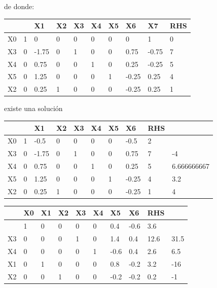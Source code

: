 \begin{itemize}
\begin{center}
de donde:        

\begin{tabular}{|l|l|l|l|l|l|l|l|l|l|}
\hline
   &   & X1    & X2 & X3 & X4 & X5 & X6    & X7    & RHS                       \\ \hline
X0 & 1 & 0     & 0  & 0  & 0  & 0  & 0     & 1     & \cellcolor[HTML]{32CB00}0 \\ \hline
X3 & 0 & -1.75 & 0  & 1  & 0  & 0  & 0.75  & -0.75 & 7                         \\ \hline
X4 & 0 & 0.75  & 0  & 0  & 1  & 0  & 0.25  & -0.25 & 5                         \\ \hline
X5 & 0 & 1.25  & 0  & 0  & 0  & 1  & -0.25 & 0.25  & 4                         \\ \hline
X2 & 0 & 0.25  & 1  & 0  & 0  & 0  & -0.25 & 0.25  & 1                         \\ \hline
\end{tabular}

existe una soluci\'on

\begin{tabular}{|l|l|l|l|l|l|l|l|l|l|}
\hline
   &   & X1                           & X2 & X3 & X4 & X5 & X6    & RHS &                             \\ \hline
X0 & 1 & -0.5                         & 0  & 0  & 0  & 0  & -0.5  & 2   &                             \\ \hline
X3 & 0 & -1.75                        & 0  & 1  & 0  & 0  & 0.75  & 7   & -4                          \\ \hline
X4 & 0 & 0.75                         & 0  & 0  & 1  & 0  & 0.25  & 5   & 6.666666667                 \\ \hline
X5 & 0 & \cellcolor[HTML]{32CB00}1.25 & 0  & 0  & 0  & 1  & -0.25 & 4   & \cellcolor[HTML]{32CB00}3.2 \\ \hline
X2 & 0 & 0.25                         & 1  & 0  & 0  & 0  & -0.25 & 1   & 4                           \\ \hline
\end{tabular}

\begin{tabular}{|l|l|l|l|l|l|l|l|l|l|}
\hline
   & X0 & X1 & X2 & X3 & X4 & X5   & X6                          & RHS  &                             \\ \hline
   & 1  & 0  & 0  & 0  & 0  & 0.4  & -0.6                        & 3.6  &                             \\ \hline
X3 & 0  & 0  & 0  & 1  & 0  & 1.4  & 0.4                         & 12.6 & 31.5                        \\ \hline
X4 & 0  & 0  & 0  & 0  & 1  & -0.6 & \cellcolor[HTML]{32CB00}0.4 & 2.6  & \cellcolor[HTML]{32CB00}6.5 \\ \hline
X1 & 0  & 1  & 0  & 0  & 0  & 0.8  & -0.2                        & 3.2  & -16                         \\ \hline
X2 & 0  & 0  & 1  & 0  & 0  & -0.2 & -0.2                        & 0.2  & -1                          \\ \hline
\end{tabular}      
        

\end{center}
\end{itemize}
